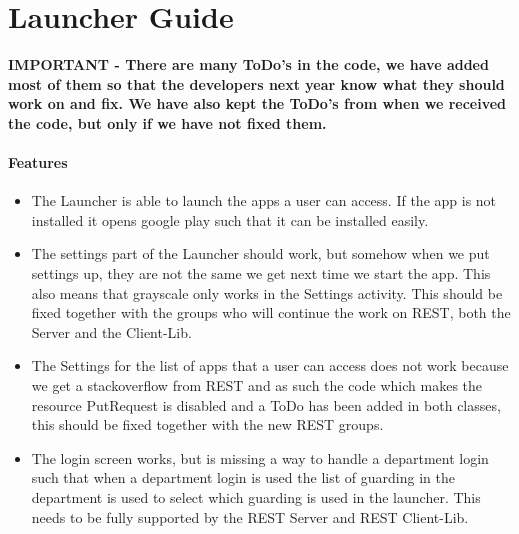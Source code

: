 \chapter{Launcher Guide}

\textbf{IMPORTANT - There are many ToDo's in the code, we have added most of
them so that the developers next year know what they should work on and fix. We
have also kept the ToDo's from when we received the code, but only if we have
not fixed them.}

\subsubsection{Features}
\begin{itemize}
  \item The Launcher is able to launch the apps a user can access. If the app
  is not installed it opens google play such that it can be installed easily.
  \item The settings part of the Launcher should work, but somehow when we put
  settings up, they are not the same we get next time we start the app. This
  also means that grayscale only works in the Settings activity. This should be
  fixed together with the groups who will continue the work on REST, both the
  Server and the Client-Lib.
  \item The Settings for the list of apps that a user can access does not work
  because we get a stackoverflow from REST and as such the code which makes the
  resource PutRequest is disabled and a ToDo has been added in both classes,
  this should be fixed together with the new REST groups.
  \item The login screen works, but is missing a way to handle a department
  login such that when a department login is used the list of guarding in the
  department is used to select which guarding is used in the launcher. This
  needs to be fully supported by the REST Server and REST Client-Lib.
\end{itemize}

